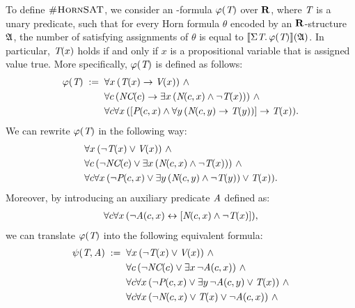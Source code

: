 \begin{example}
To define $\textsc{\#HornSAT}$, we consider an \so-formula $\varphi(\textit{T})$ over $\mathbf{R}$, where $\textit{T}$ is a unary predicate, such that for every Horn formula $\theta$ encoded by an $\mathbf{R}$-structure $\mathfrak{A}$, the number of satisfying assignments of $\theta$ is equal to ${\llbracket{}{\Sigma{\textit{T}}.\, \varphi(\textit{T})}\rrbracket}(\mathfrak{A})$. In particular, $\textit{T}(x)$ holds if and only if $x$ is a propositional variable that is assigned value true.  More specifically, $\varphi(\textit{T})$ is defined as follows:
\begin{align*}
\varphi(\textit{T}) \; :=\;\;  &\forall x \, (\textit{T}(x) \to \textit{V}(x)) \ \wedge\\
&\forall c \, (\textit{NC}(c) \to \exists x \, (\textit{N}(c,x) \wedge \neg \textit{T}(x))) \ \wedge\\
&\forall c \forall x \, ([\textit{P}(c,x) \wedge \forall y \, (\textit{N}(c,y) \to \textit{T}(y))] \to \textit{T}(x)).
\end{align*}
We can rewrite $\varphi(\textit{T})$ in the following way:
\begin{align*}
&\forall x \, (\neg \textit{T}(x) \vee \textit{V}(x)) \ \wedge\\
&\forall c \, (\neg \textit{NC}(c) \vee \exists x \, (\textit{N}(c,x) \wedge \neg \textit{T}(x)))\ \wedge\\
&\forall c \forall x \, (\neg \textit{P}(c,x) \vee \exists y \, (\textit{N}(c,y) \wedge \neg \textit{T}(y)) \vee \textit{T}(x)).
\end{align*}
Moreover, by introducing an auxiliary predicate $\textit{A}$ defined as:
\begin{align*}
\forall c \forall x \, (\neg \textit{A}(c,x) \leftrightarrow [\textit{N}(c,x) \wedge \neg \textit{T}(x)]),
\end{align*}
we can translate $\varphi(\textit{T})$ into the following equivalent formula:
\begin{align*}
\psi(\pT,\pA) \; :=\;\;  &\forall x \, (\neg \pT(x) \vee \pV(x)) \ \wedge\\
&\forall c \, (\neg \textit{NC}(c) \vee \exists x \, \neg \textit{A}(c,x)) \ \wedge\\
&\forall c \forall x \, (\neg \textit{P}(c,x) \vee \exists y \, \neg \textit{A}(c,y) \vee \textit{T}(x)) \ \wedge\\
&\forall c \forall x \, (\neg \textit{N}(c,x) \vee \textit{T}(x) \vee \neg \textit{A}(c,x)) \ \wedge\\

\end{align*}
\end{example}
